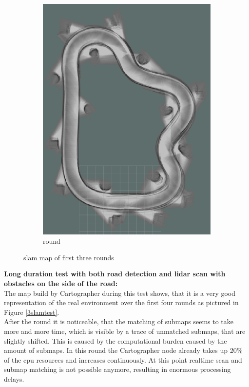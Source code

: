 \begin{figure}[H]
\begin{subfigure}{.3\linewidth}
		\includegraphics[width=\textwidth]{Pictures/2slamtest3}
		\caption{ round}
	\end{subfigure}

	\caption{slam map of first three rounds}
	\label{2slamtest}

\end{figure}



\textbf{Long duration test with both road detection and lidar scan with obstacles on the side of the road:}\\

The map build by Cartographer during this test shows, that it is a very good representation of the real environment over the first four rounds as pictured in Figure \ref{3slamtest}.\\

After the  round it is noticeable, that the matching of submaps seems to take more and more time, which is visible by a trace of unmatched submaps, that are slightly shifted. This is caused by the computational burden caused by the amount of submaps. In this round the Cartographer node already takes up 20\% of the cpu resources and increases continuously. At this point realtime scan and submap matching is not possible anymore, resulting in enormous processing delays.

